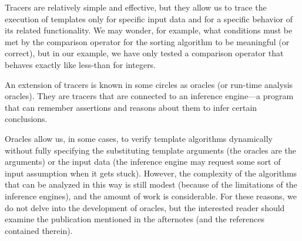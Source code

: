 Tracers are relatively simple and effective, but they allow us to trace the execution of templates only for specific input data and for a specific behavior of its related functionality. We may wonder, for example, what conditions must be met by the comparison operator for the sorting algorithm to be meaningful (or correct), but in our example, we have only tested a comparison operator that behaves exactly like less-than for integers.

An extension of tracers is known in some circles as oracles (or run-time analysis oracles). They are tracers that are connected to an inference engine—a program that can remember assertions and reasons about them to infer certain conclusions.

Oracles allow us, in some cases, to verify template algorithms dynamically without fully specifying the substituting template arguments (the oracles are the arguments) or the input data (the inference engine may request some sort of input assumption when it gets stuck). However, the complexity of the algorithms that can be analyzed in this way is still modest (because of the limitations of the inference engines), and the amount of work is considerable. For these reasons, we do not delve into the development of oracles, but the interested reader should examine the publication mentioned in the afternotes (and the references contained therein).